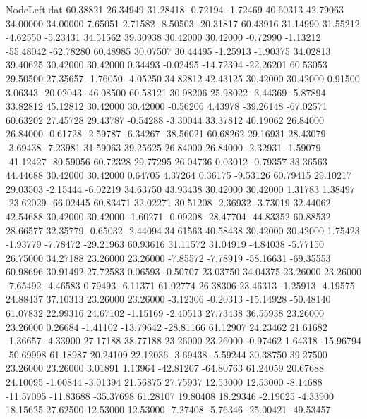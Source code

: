 \begin{filecontents}{NodeLeft.dat}
  60.38821   26.34949   31.28418    -0.72194   -1.72469   40.60313   42.79063   34.00000   34.00000    7.65051    2.71582   -8.50503  -20.31817
  60.43916   31.14990   31.55212    -4.62550   -5.23431   34.51562   39.30938   30.42000   30.42000   -0.72990   -1.13212  -55.48042  -62.78280
  60.48985   30.07507   30.44495    -1.25913   -1.90375   34.02813   39.40625   30.42000   30.42000    0.34493   -0.02495  -14.72394  -22.26201
  60.53053   29.50500   27.35657    -1.76050   -4.05250   34.82812   42.43125   30.42000   30.42000    0.91500    3.06343  -20.02043  -46.08500
  60.58121   30.98206   25.98022    -3.44369   -5.87894   33.82812   45.12812   30.42000   30.42000   -0.56206    4.43978  -39.26148  -67.02571
  60.63202   27.45728   29.43787    -0.54288   -3.30044   33.37812   40.19062   26.84000   26.84000   -0.61728   -2.59787   -6.34267  -38.56021
  60.68262   29.16931   28.43079    -3.69438   -7.23981   31.59063   39.25625   26.84000   26.84000   -2.32931   -1.59079  -41.12427  -80.59056
  60.72328   29.77295   26.04736     0.03012   -0.79357   33.36563   44.44688   30.42000   30.42000    0.64705    4.37264    0.36175   -9.53126
  60.79415   29.10217   29.03503    -2.15444   -6.02219   34.63750   43.93438   30.42000   30.42000    1.31783    1.38497  -23.62029  -66.02445
  60.83471   32.02271   30.51208    -2.36932   -3.73019   32.44062   42.54688   30.42000   30.42000   -1.60271   -0.09208  -28.47704  -44.83352
  60.88532   28.66577   32.35779    -0.65032   -2.44094   34.61563   40.58438   30.42000   30.42000    1.75423   -1.93779   -7.78472  -29.21963
  60.93616   31.11572   31.04919    -4.84038   -5.77150   26.75000   34.27188   23.26000   23.26000   -7.85572   -7.78919  -58.16631  -69.35553
  60.98696   30.91492   27.72583     0.06593   -0.50707   23.03750   34.04375   23.26000   23.26000   -7.65492   -4.46583    0.79493   -6.11371
  61.02774   26.38306   23.46313    -1.25913   -4.19575   24.88437   37.10313   23.26000   23.26000   -3.12306   -0.20313  -15.14928  -50.48140
  61.07832   22.99316   24.67102    -1.15169   -2.40513   27.73438   36.55938   23.26000   23.26000    0.26684   -1.41102  -13.79642  -28.81166
  61.12907   24.23462   21.61682    -1.36657   -4.33900   27.17188   38.77188   23.26000   23.26000   -0.97462    1.64318  -15.96794  -50.69998
  61.18987   20.24109   22.12036    -3.69438   -5.59244   30.38750   39.27500   23.26000   23.26000    3.01891    1.13964  -42.81207  -64.80763
  61.24059   20.67688   24.10095    -1.00844   -3.01394   21.56875   27.75937   12.53000   12.53000   -8.14688  -11.57095  -11.83688  -35.37698
  61.28107   19.80408   18.29346    -2.19025   -4.33900   18.15625   27.62500   12.53000   12.53000   -7.27408   -5.76346  -25.00421  -49.53457

\end{filecontents}
